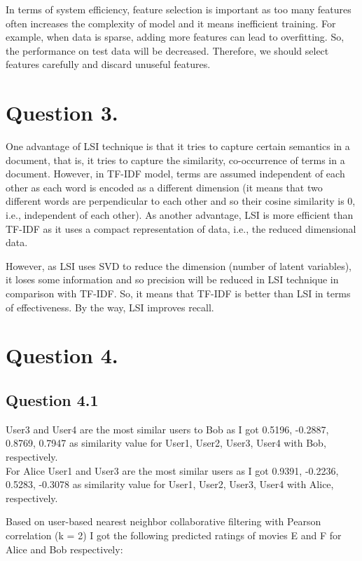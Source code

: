 \documentclass[11pt]{article}
\begin{document}
In terms of system efficiency, feature selection is important as too many features often increases the complexity of model and it means inefficient training. For example, when data is sparse, adding more features can lead to overfitting. So, the performance on test data will be decreased. Therefore, we should select features carefully and discard unuseful features. 

\section*{Question 3.}%
One advantage of LSI technique is that it tries to capture certain semantics in a document, that is, it tries to capture the similarity, co-occurrence of terms in a document. However, in TF-IDF model, terms are assumed independent of each other as each word is encoded as a different dimension (it means that two different words are perpendicular to each other and so their cosine similarity is 0, i.e., independent of each other). As another advantage, LSI is more efficient than TF-IDF as it uses a compact representation of data, i.e., the reduced dimensional data. 

However, as LSI uses SVD to reduce the dimension (number of latent variables), it loses some information and so precision will be reduced in LSI technique in comparison with TF-IDF. So, it means that TF-IDF is better than LSI in terms of effectiveness. By the way, LSI improves recall. 

\section*{Question 4.}%

\subsection*{Question 4.1}%

User3 and User4 are the most similar users to Bob as I got 0.5196, -0.2887, 0.8769, 0.7947 as similarity value for User1, User2, User3, User4 with Bob, respectively. \\
For Alice User1 and User3 are the most similar users as I got 0.9391, -0.2236, 0.5283, -0.3078 as similarity value for User1, User2, User3, User4 with Alice, respectively. 

Based on user-based nearest neighbor collaborative filtering with Pearson correlation (k = 2) I got the following predicted ratings of movies E and F for Alice and Bob respectively:
\end{document}
